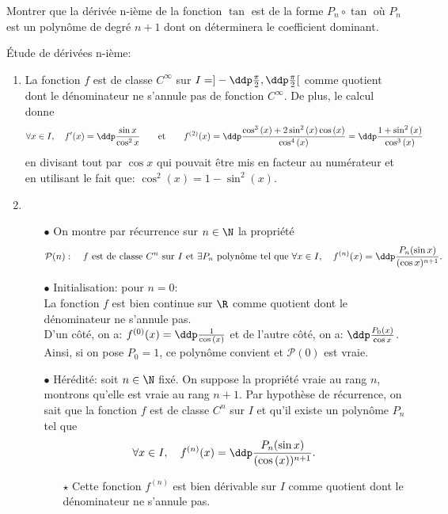 \documentclass[a4paper, 11pt,reqno]{article}
\begin{document}
\begin{exercice}
	Montrer que la d\'eriv\'ee n-i\`eme de la fonction $\tan{}$ est de la forme $P_n\circ \tan{}$ o\`u $P_n$ est un polyn\^ome de degr\'e $n+1$ dont on d\'eterminera le coefficient dominant.
\end{exercice}
\begin{correction}
	\'Etude de d\'eriv\'ees n-i\`eme:
	\begin{enumerate}
		\item La fonction $f$ est de classe $C^{\infty}$ sur $I=\rbrack -\ddp\frac{\pi}{2},\ddp\frac{\pi}{2}\lbrack$ comme quotient dont le d\'enominateur
		      ne s'annule pas de fonction $C^{\infty}$. De plus, le calcul donne
		      $$\forall x\in I,\quad f^{\prime}(x)=\ddp\frac{\sin{x}}{\cos^2{x}}\qquad \hbox{et}\qquad f^{(2)}(x)=
			      \ddp\frac{\cos^3{(x)} +2\sin^2{(x)}\cos{(x)}  }{\cos^4{(x)}}=\ddp\frac{1+\sin^2{(x)}}{\cos^3{(x)}}$$
		      en divisant tout par $\cos{x}$ qui pouvait \^etre mis en facteur au num\'erateur et en utilisant le fait que: $\cos^2{(x)}=1-\sin^2{(x)}$.
		\item
		      \begin{itemize}
			      \item[$\bullet$] On montre par r\'ecurrence sur $n\in\N$ la propri\'et\'e
			            $$\mathcal{P}(n):\quad f\ \hbox{est de classe}\ C^n\ \hbox{sur}\ I\ \hbox{et}\ \exists P_n\ \hbox{polyn\^ome tel que}\ \forall x\in I,\quad f^{(n)}(x)=\ddp\frac{P_n(\sin{x})}{(\cos{x})^{n+1}}.          $$
			      \item[$\bullet$] Initialisation: pour $n=0$:\\
			            \noindent La fonction $f$ est bien continue sur $\R$ comme quotient dont le d\'enominateur ne s'annule pas.\\
			            \noindent D'un c\^ot\'e, on a: $f^{(0)}(x)=\ddp\frac{1}{\cos{(x)}}$ et de l'autre c\^ot\'e, on a: $\ddp\frac{P_0(x)}{\cos{x}}$. Ainsi, si on pose $P_0=1$, ce polyn\^ome convient et $\mathcal{P}(0)$ est vraie.
			      \item[$\bullet$] H\'er\'edit\'e: soit $n\in\N$ fix\'e. On suppose la propri\'et\'e vraie au rang $n$, montrons qu'elle est vraie au rang $n+1$. Par hypoth\`ese de r\'ecurrence, on sait que la fonction $f$ est de classe $C^n$ sur $I$ et qu'il existe un polyn\^ome $P_n$ tel que
			            $$\forall x\in I,\quad f^{(n)}(x)=\ddp\frac{P_n(\sin{x})}{(\cos{(x)})^{n+1}}.$$
			            \begin{itemize}
				            \item[$\star$] Cette fonction $f^{(n)}$ est bien d\'erivable sur $I$ comme quotient dont le d\'enominateur ne s'annule pas.

\end{itemize}
\end{itemize}
\end{enumerate}
\end{correction}
\end{document}

